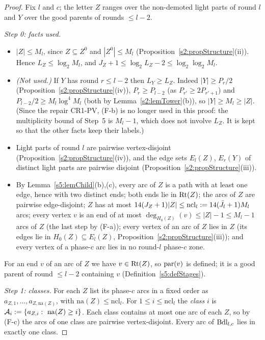 \begin{proof}
Fix $l$ and $c$; the letter $Z$ ranges over the non-demoted light parts of round $l$ and $Y$ over the good parents of rounds $\le l-2$.

\emph{Step 0: facts used.}
\begin{itemize}
\item[(F-a)] $|Z|\le M_l$, since $Z\subseteq Z^0$ and $|Z^0|\le M_l$ (Proposition~\ref{s2:propStructure}(ii)). Hence $L_Z\le\log_2M_l$, and $J_Z+1\le\log_2L_Z-2\le\log_2\log_2M_l$.
\item[(F-b)] \emph{(Not used.)} If $Y$ has round $r\le l-2$ then $L_Y\ge L_Z$. Indeed $|Y|\ge P_r/2$ (Proposition~\ref{s2:propStructure}(iv)), $P_r\ge P_{l-2}$ (as $P_{r'}\ge2P_{r'+1}$) and $P_{l-2}/2\ge M_l\log^4M_l$ (both by Lemma~\ref{s2:lemTower}(b)), so $|Y|\ge M_l\ge|Z|$. (Since the repair \textsf{CR1-PV}, (F-b) is no longer used in this proof: the multiplicity bound of Step~5 is $M_l-1$, which does not involve $L_Z$. It is kept so that the other facts keep their labels.)
\item[(F-c)] Light parts of round $l$ are pairwise vertex-disjoint (Proposition~\ref{s2:propStructure}(iv)), and the edge sets $E_l(Z)$, $E_r(Y)$ of distinct light parts are pairwise disjoint (Proposition~\ref{s2:propStructure}(iii)).
\item[(F-d)] By Lemma~\ref{s5:lemChild}(b),(c), every arc of $Z$ is a path with at least one edge, hence with two distinct ends; both ends lie in $\mathrm{Rt}(Z)$; the arcs of $Z$ are pairwise edge-disjoint; $Z$ has at most $14(J_Z+1)|Z|\le \mathrm{ncl}_l\mathrel{:=}14(\bar J_l+1)M_l$ arcs; every vertex $v$ is an end of at most $\deg_{H_0(Z)}(v)\le|Z|-1\le M_l-1$ arcs of $Z$ (the last step by (F-a)); every vertex of an arc of $Z$ lies in $Z$ (its edges lie in $H_0(Z)\subseteq E_l(Z)$, Proposition~\ref{s2:propStructure}(iii)); and every vertex of a phase-$c$ arc lies in no round-$l$ phase-$c$ zone.
\end{itemize}
For an end $v$ of an arc of $Z$ we have $v\in\mathrm{Rt}(Z)$, so $\mathrm{par}(v)$ is defined; it is a good parent of round $\le l-2$ containing $v$ (Definition~\ref{s5:defStages}).

\emph{Step 1: classes.} For each $Z$ list its phase-$c$ arcs in a fixed order as $a_{Z,1},\dots,a_{Z,\mathrm{na}(Z)}$, with $\mathrm{na}(Z)\le \mathrm{ncl}_l$. For $1\le i\le \mathrm{ncl}_l$ the \emph{class} $i$ is $\mathcal A_i\defeq\{a_{Z,i}:\ \mathrm{na}(Z)\ge i\}$. Each class contains at most one arc of each $Z$, so by (F-c) the arcs of one class are pairwise vertex-disjoint. Every arc of $\mathrm{Bdl}_{l,c}$ lies in exactly one class.


\end{proof}
